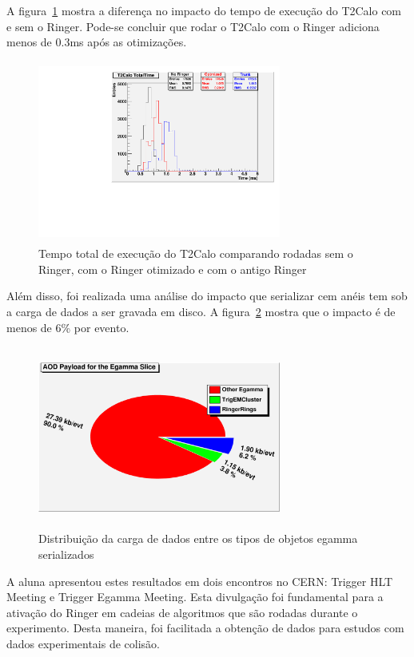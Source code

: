 \documentclass[a4paper,10pt,titlepage]{article}
\begin{document}
A figura~\ref{fig:egamma_ringer_time_optimization} mostra a diferença no impacto do tempo de execução do T2Calo com e sem o Ringer.
Pode-se concluir que rodar o T2Calo com o Ringer adiciona menos de 0.3ms após as otimizações.

\begin{figure}[htbp!]
 \centering
 \includegraphics[width=8cm,height=6cm]{Figs/egamma_refactoring/egamma_ringer_time_optimization.pdf}
 \caption{Tempo total de execução do T2Calo comparando rodadas sem o Ringer, com o Ringer otimizado e com o antigo Ringer}
 \label{fig:egamma_ringer_time_optimization}
\end{figure}

Além disso, foi realizada uma análise do impacto que serializar cem anéis tem sob a carga de dados a ser gravada em disco.
A figura~\ref{fig:aod_payload} mostra que o impacto é de menos de 6\% por evento.

\begin{figure}[htbp!]
 \centering
 \includegraphics[width=8cm,height=6cm]{Figs/egamma_refactoring/aod_payload.png}
 \caption{Distribuição da carga de dados entre os tipos de objetos egamma serializados}
 \label{fig:aod_payload}
\end{figure}

A aluna apresentou estes resultados em dois encontros no CERN: Trigger HLT Meeting e Trigger Egamma Meeting.
Esta divulgação foi fundamental para a ativação do Ringer em cadeias de algoritmos que são rodadas durante o experimento.
Desta maneira, foi facilitada a obtenção de dados para estudos com dados experimentais de colisão.
\end{document}

